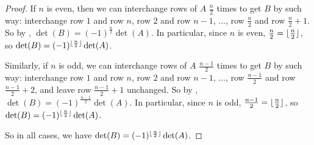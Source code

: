 \begin{proof}
If \(n\) is even, then we can interchange rows of \(A\) \(\frac{n}{2}\) times to get \(B\) by such way:
interchange row \(1\) and row \(n\), row \(2\) and row \(n - 1\), ..., row \(\frac{n}{2}\) and row \(\frac{n}{2} + 1\).
So by , \(\det(B) = (-1)^{\frac{n}{2}} \det(A)\).
In particular, since \(n\) is even, \(\frac{n}{2} = \lfloor\frac{n}{2}\rfloor\), so \(\det(B) = (-1)^{\lfloor\frac{n}{2}\rfloor} \det(A)\).

Similarly, if \(n\) is odd, we can interchange rows of \(A\) \(\frac{n - 1}{2}\) times to get \(B\) by such way:
interchange row \(1\) and row \(n\), row \(2\) and row \(n - 1\), ..., row \(\frac{n - 1}{2}\) and row \(\frac{n - 1}{2} + 2\), and leave row \(\frac{n - 1}{2} + 1\) unchanged.
So by , \(\det(B) = (-1)^{\frac{n - 1}{2}} \det(A)\).
In particular, since \(n\) is odd, \(\frac{n - 1}{2} = \lfloor\frac{n}{2}\rfloor\), so \(\det(B) = (-1)^{\lfloor\frac{n}{2}\rfloor} \det(A)\).

So in all cases, we have \(\det(B) = (-1)^{\lfloor\frac{n}{2}\rfloor} \det(A)\).
\end{proof}
